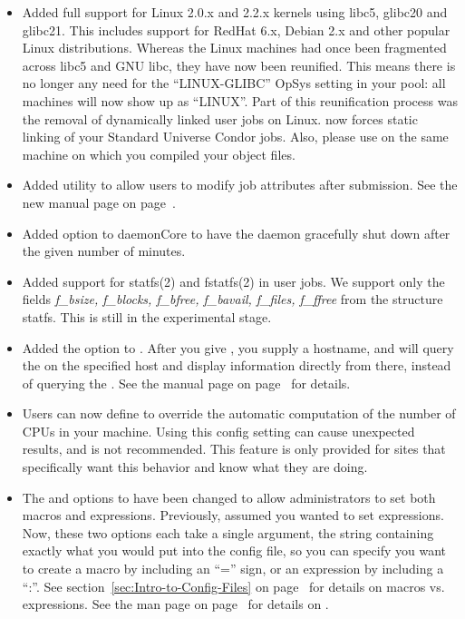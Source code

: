 \begin{itemize}

\item Added full support for Linux 2.0.x and 2.2.x kernels using
libc5, glibc20 and glibc21.
This includes support for RedHat 6.x, Debian 2.x and other popular
Linux distributions.
Whereas the Linux machines had once been fragmented across libc5 and
GNU libc, they have now been reunified.
This means there is no longer any need for the ``LINUX-GLIBC'' OpSys
setting in your pool: all machines will now show up as ``LINUX''.
Part of this reunification process was the removal of dynamically
linked user jobs on Linux.
 now forces static linking of your Standard Universe
Condor jobs. 
Also, please use  on the same machine on which you
compiled your object files.

\item Added  utility to allow users to modify job
attributes after submission.  See the new manual page on
page~\pageref{man-condor-qedit}.

\item Added  option to daemonCore to have
the daemon gracefully shut down after the given number of minutes.

\item Added support for statfs(2) and fstatfs(2) in user jobs. We support 
only the fields
\textit{f\_bsize, f\_blocks, f\_bfree, f\_bavail, f\_files, f\_ffree} from
the structure statfs. This is still in the experimental stage.

\item Added the  option to .
After you give , you supply a hostname, and
 will query the  on the specified host
and display information directly from there, instead of querying the
.
See the manual page on page~\pageref{man-condor-submit} for details. 

\item Users can now define  to override the automatic
computation of the number of CPUs in your machine.
Using this config setting can cause unexpected results, and is not
recommended. 
This feature is only provided for sites that specifically want this
behavior and know what they are doing.

\item The  and  options to 
have been changed to allow administrators to set both macros and
expressions.
Previously,  assumed you wanted to set
expressions.
Now, these two options each take a single argument, the string
containing exactly what you would put into the config file, so you can
specify you want to create a macro by including an ``='' sign, or an
expression by including a ``:''.
See section~\ref{sec:Intro-to-Config-Files} on
page~\pageref{sec:Intro-to-Config-Files} for details on macros
vs. expressions.
See the  man page on
page~\pageref{man:condor-config-val} for details on
.  


\end{itemize}
